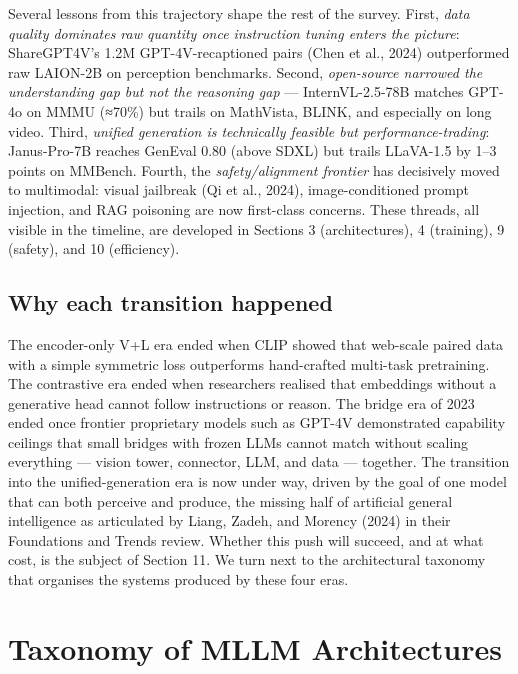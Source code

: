 Several lessons from this trajectory shape the rest of the survey. First, \emph{data quality dominates raw quantity once instruction tuning enters the picture}: ShareGPT4V's 1.2M GPT-4V-recaptioned pairs (Chen et al., 2024) outperformed raw LAION-2B on perception benchmarks. Second, \emph{open-source narrowed the understanding gap but not the reasoning gap} --- InternVL-2.5-78B matches GPT-4o on MMMU (≈70\%) but trails on MathVista, BLINK, and especially on long video. Third, \emph{unified generation is technically feasible but performance-trading}: Janus-Pro-7B reaches GenEval 0.80 (above SDXL) but trails LLaVA-1.5 by 1--3 points on MMBench. Fourth, the \emph{safety/alignment frontier} has decisively moved to multimodal: visual jailbreak (Qi et al., 2024), image-conditioned prompt injection, and RAG poisoning are now first-class concerns. These threads, all visible in the timeline, are developed in Sections 3 (architectures), 4 (training), 9 (safety), and 10 (efficiency).

\subsection{Why each transition happened}\label{why-each-transition-happened}

The encoder-only V+L era ended when CLIP showed that web-scale paired data with a simple symmetric loss outperforms hand-crafted multi-task pretraining. The contrastive era ended when researchers realised that embeddings without a generative head cannot follow instructions or reason. The bridge era of 2023 ended once frontier proprietary models such as GPT-4V demonstrated capability ceilings that small bridges with frozen LLMs cannot match without scaling everything --- vision tower, connector, LLM, and data --- together. The transition into the unified-generation era is now under way, driven by the goal of one model that can both perceive and produce, the missing half of artificial general intelligence as articulated by Liang, Zadeh, and Morency (2024) in their Foundations and Trends review. Whether this push will succeed, and at what cost, is the subject of Section 11. We turn next to the architectural taxonomy that organises the systems produced by these four eras.

\section{Taxonomy of MLLM Architectures}\label{taxonomy-of-mllm-architectures}

